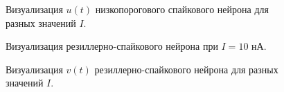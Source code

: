 \begin{figure}[h]
	\caption{Визуализация $u(t)$ низкопорогового спайкового нейрона для разных значений $I$.}
	\label{lts_different_I_recovery}
\end{figure}

\begin{figure}[h]
\caption{Визуализация резиллерно-спайкового нейрона при $I=10$ нА.}
\label{1_rz}
\end{figure}

\begin{figure}[h]
	\caption{Визуализация $v(t)$ резиллерно-спайкового нейрона для разных значений $I$.}
	\label{rz_different_I_potentials}
\end{figure}


